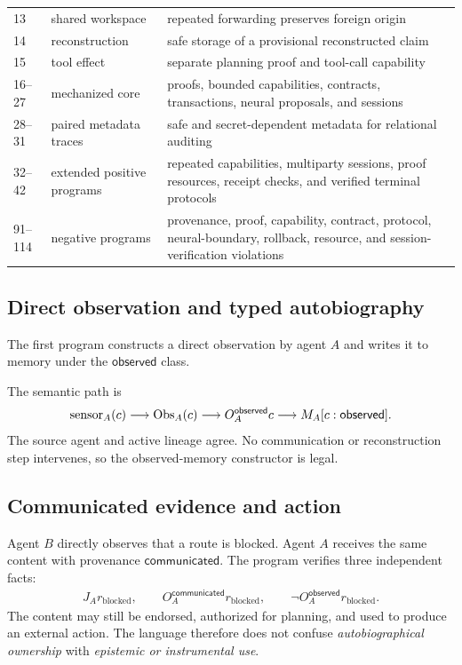 \begin{longtable}{p{}p{}p{}}
13 & shared workspace & repeated forwarding preserves foreign origin \\
14 & reconstruction & safe storage of a provisional reconstructed claim \\
15 & tool effect & separate planning proof and tool-call capability \\
16--27 & mechanized core & proofs, bounded capabilities, contracts, transactions, neural proposals, and sessions \\
28--31 & paired metadata traces & safe and secret-dependent metadata for relational auditing \\
32--42 & extended positive programs & repeated capabilities, multiparty sessions, proof resources, receipt checks, and verified terminal protocols \\
91--114 & negative programs & provenance, proof, capability, contract, protocol, neural-boundary, rollback, resource, and session-verification violations \\
\bottomrule
\end{longtable}

\subsection{Direct observation and typed autobiography}

The first program constructs a direct observation by agent \(A\) and writes it
to memory under the \(\mathsf{observed}\) class.



The semantic path is
\[
\operatorname{sensor}_A(c)
\longrightarrow
\operatorname{Obs}_A(c)
\longrightarrow
O_A^{\mathsf{observed}}c
\longrightarrow
M_A[c:\mathsf{observed}].
\]
The source agent and active lineage agree.  No communication or reconstruction
step intervenes, so the observed-memory constructor is legal.

\subsection{Communicated evidence and action}



Agent \(B\) directly observes that a route is blocked.  Agent \(A\) receives the
same content with provenance \(\mathsf{communicated}\).  The program verifies
three independent facts:
\begin{align*}
J_A r_{\mathrm{blocked}},\qquad
O_A^{\mathsf{communicated}}r_{\mathrm{blocked}},\qquad
\neg O_A^{\mathsf{observed}}r_{\mathrm{blocked}}.
\end{align*}
The content may still be endorsed, authorized for planning, and used to produce
an external action.  The language therefore does not confuse
\emph{autobiographical ownership} with \emph{epistemic or instrumental use}.

